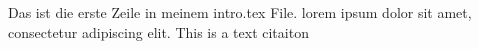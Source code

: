 Das ist die erste Zeile in meinem intro.tex File.
lorem ipsum dolor sit amet, consectetur adipiscing elit.
This is a text citaiton \cite{verma2018}